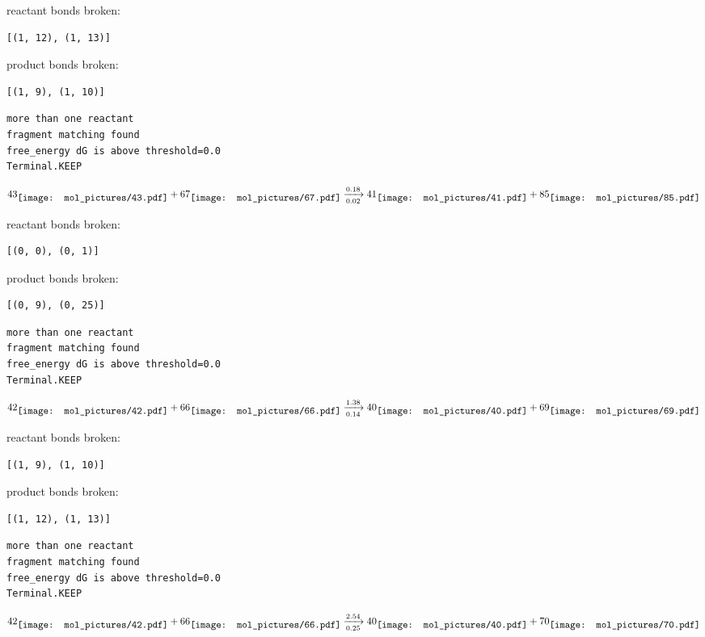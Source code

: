 \documentclass{article}
\begin{document}
reactant bonds broken:\begin{verbatim}
[(1, 12), (1, 13)]
\end{verbatim}
product bonds broken:\begin{verbatim}
[(1, 9), (1, 10)]
\end{verbatim}




\vspace{1cm}
\begin{verbatim}
more than one reactant
fragment matching found
free_energy dG is above threshold=0.0
Terminal.KEEP
\end{verbatim}
$$
43
\raisebox{-.5\height}{\texttt{[image: mol\_pictures/43.pdf]}}
+
67
\raisebox{-.5\height}{\texttt{[image: mol\_pictures/67.pdf]}}
\xrightarrow[0.02]{0.18}
41
\raisebox{-.5\height}{\texttt{[image: mol\_pictures/41.pdf]}}
+
85
\raisebox{-.5\height}{\texttt{[image: mol\_pictures/85.pdf]}}
$$


reactant bonds broken:\begin{verbatim}
[(0, 0), (0, 1)]
\end{verbatim}
product bonds broken:\begin{verbatim}
[(0, 9), (0, 25)]
\end{verbatim}




\vspace{1cm}
\begin{verbatim}
more than one reactant
fragment matching found
free_energy dG is above threshold=0.0
Terminal.KEEP
\end{verbatim}
$$
42
\raisebox{-.5\height}{\texttt{[image: mol\_pictures/42.pdf]}}
+
66
\raisebox{-.5\height}{\texttt{[image: mol\_pictures/66.pdf]}}
\xrightarrow[0.14]{1.38}
40
\raisebox{-.5\height}{\texttt{[image: mol\_pictures/40.pdf]}}
+
69
\raisebox{-.5\height}{\texttt{[image: mol\_pictures/69.pdf]}}
$$


reactant bonds broken:\begin{verbatim}
[(1, 9), (1, 10)]
\end{verbatim}
product bonds broken:\begin{verbatim}
[(1, 12), (1, 13)]
\end{verbatim}




\vspace{1cm}
\begin{verbatim}
more than one reactant
fragment matching found
free_energy dG is above threshold=0.0
Terminal.KEEP
\end{verbatim}
$$
42
\raisebox{-.5\height}{\texttt{[image: mol\_pictures/42.pdf]}}
+
66
\raisebox{-.5\height}{\texttt{[image: mol\_pictures/66.pdf]}}
\xrightarrow[0.25]{2.54}
40
\raisebox{-.5\height}{\texttt{[image: mol\_pictures/40.pdf]}}
+
70
\raisebox{-.5\height}{\texttt{[image: mol\_pictures/70.pdf]}}
$$
\end{document}
